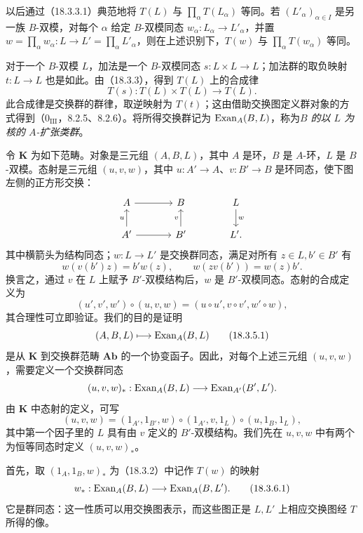 以后通过（18.3.3.1）典范地将 $T(L)$ 与 $\prod_
\alpha T(L_\alpha)$ 等同。若 $(L'_\alpha)_{\alpha\in I}$ 是另一族 $B$-双模，对每个 $\alpha$ 给定 $B$-双模同态 $w_\alpha:L_\alpha\to L'_\alpha$，并置 $w=\prod_\alpha w_\alpha:L\to L'=\prod_\alpha L'_\alpha$，则在上述识别下，$T(w)$ 与 $\prod_\alpha T(w_\alpha)$ 等同。

对于一个 $B$-双模 $L$，加法是一个 $B$-双模同态 $s:L\times L\to L$；加法群的取负映射 $t:L\to L$ 也是如此。由（18.3.3），得到 $T(L)$ 上的合成律
\[
 T(s):T(L)\times T(L)\longrightarrow T(L).
\]
此合成律是交换群的群律，取逆映射为 $T(t)$；这由借助交换图定义群对象的方式得到（$0_{\mathrm{III}}$，8.2.5、8.2.6）。将所得交换群记为 $\operatorname{Exan}_A(B,L)$，称为\emph{$B$ 的以 $L$ 为核的 $A$-扩张类群}。

令 $\mathbf K$ 为如下范畴。对象是三元组 $(A,B,L)$，其中 $A$ 是环，$B$ 是 $A$-环，$L$ 是 $B$-双模。态射是三元组 $(u,v,w)$，其中 $u:A'\to A$、$v:B'\to B$ 是环同态，使下图左侧的正方形交换：
\[
\begin{tikzcd}[column sep=large]
 A\arrow[r]&B&L\arrow[d,"w"]\\
 A'\arrow[u,"u"]\arrow[r]&B'\arrow[u,"v"]&L'.
\end{tikzcd}
\]
其中横箭头为结构同态；$w:L\to L'$ 是交换群同态，满足对所有 $z\in L,b'\in B'$ 有
\[
 w(v(b')z)=b'w(z),\qquad w(zv(b'))=w(z)b'.
\]
换言之，通过 $v$ 在 $L$ 上赋予 $B'$-双模结构后，$w$ 是 $B'$-双模同态。态射的合成定义为
\[
 (u',v',w')\circ(u,v,w)=(u\circ u',v\circ v',w'\circ w),
\]
其合理性可立即验证。我们的目的是证明
\begin{equation}
 (A,B,L)\longmapsto\operatorname{Exan}_A(B,L)
 \tag{18.3.5.1}
\end{equation}
是从 $\mathbf K$ 到交换群范畴 $\mathbf{Ab}$ 的一个协变函子。因此，对每个上述三元组 $(u,v,w)$，需要定义一个交换群同态
\[
 (u,v,w)_*:\operatorname{Exan}_A(B,L)\longrightarrow\operatorname{Exan}_{A'}(B',L').
\]
由 $\mathbf K$ 中态射的定义，可写
\[
 (u,v,w)=(1_{A'},1_{B'},w)\circ(1_{A'},v,1_L)\circ(u,1_B,1_L),
\]
其中第一个因子里的 $L$ 具有由 $v$ 定义的 $B'$-双模结构。我们先在 $u,v,w$ 中有两个为恒等同态时定义 $(u,v,w)_*$。

首先，取 $(1_A,1_B,w)_*$ 为（18.3.2）中记作 $T(w)$ 的映射
\begin{equation}
 w_*:\operatorname{Exan}_A(B,L)\longrightarrow\operatorname{Exan}_A(B,L').
 \tag{18.3.6.1}
\end{equation}
它是群同态：这一性质可以用交换图表示，而这些图正是 $L,L'$ 上相应交换图经 $T$ 所得的像。

